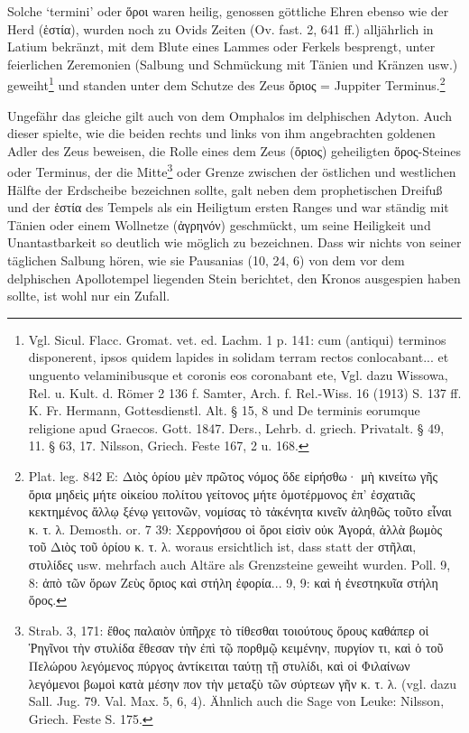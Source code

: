 \documentclass[a4paper, 11pt, oneside]{article}
\begin{document}
Solche `termini' oder ὅροι waren heilig, genossen göttliche Ehren ebenso wie der Herd (ἑστία), wurden noch zu Ovids Zeiten (Ov. fast. 2, 641 ff.) alljährlich in Latium bekränzt, mit dem Blute eines Lammes oder Ferkels besprengt, unter feierlichen Zeremonien (Salbung und Schmückung mit Tänien und Kränzen usw.) geweiht\footnote{Vgl. Sicul. Flacc. Gromat. vet. ed. Lachm. 1 p. 141: cum (antiqui) terminos disponerent, ipsos quidem lapides in solidam terram rectos conlocabant... et unguento velaminibusque et coronis eos coronabant ete, Vgl. dazu Wissowa, Rel. u. Kult. d. Römer 2 136 f. Samter, Arch. f. Rel.-Wiss. 16 (1913) S. 137 ff. K. Fr. Hermann, Gottesdienstl. Alt. § 15, 8 und De terminis eorumque religione apud Graecos. Gott. 1847. Ders., Lehrb. d. griech. Privatalt. § 49, 11. § 63, 17. Nilsson, Griech. Feste 167, 2 u. 168.} und standen unter dem Schutze des Zeus ὅριος = Juppiter Terminus.\footnote{Plat. leg. 842 E: Διὸς ὁρίου μὲν πρῶτος νόμος ὅδε εἰρήσθω· μὴ κινείτω γῆς ὅρια μηδεὶς μήτε οἰκείου πολίτου γείτονος μήτε ὁμοτέρμονος ἐπ' ἐσχατιᾶς κεκτημένος ἄλλῳ ξένῳ γειτονῶν, νομίσας τὸ τἀκένητα κινεῖν ἀληθῶς τοῦτο εἶναι κ. τ. λ. Demosth. or. 7 39: Χερρονήσου οἱ ὅροι εἰσὶν οὐκ Ἀγορά, ἀλλὰ βωμὸς τοῦ Διὸς τοῦ ὁρίου κ. τ. λ. woraus ersichtlich ist, dass statt der στῆλαι, στυλίδες usw. mehrfach auch Altäre als Grenzsteine geweiht wurden. Poll. 9, 8: ἀπὸ τῶν ὅρων Ζεὺς ὅριος καὶ στήλη ἐφορία... 9, 9: καὶ ἡ ἐνεστηκυῖα στήλη ὅρος.}

Ungefähr das gleiche gilt auch von dem Omphalos im delphischen Adyton. Auch dieser spielte, wie die beiden rechts und links von ihm angebrachten goldenen Adler des Zeus beweisen, die Rolle eines dem Zeus (ὅριος) geheiligten ὅρος-Steines oder Terminus, der die Mitte\footnote{Strab. 3, 171: ἔθος παλαιὸν ὑπῆρχε τὸ τίθεσθαι τοιούτους ὅρους καθάπερ οἱ Ῥηγῖνοι τὴν στυλίδα ἔθεσαν τὴν ἐπὶ τῷ πορθμῷ κειμένην, πυργίον τι, καὶ ὁ τοῦ Πελώρου λεγόμενος πύργος ἀντίκειται ταύτῃ τῇ στυλίδι, καὶ οἱ Φιλαίνων λεγόμενοι βωμοὶ κατὰ μέσην πον τὴν μεταξὺ τῶν σύρτεων γῆν κ. τ. λ. (vgl. dazu Sall. Jug. 79. Val. Max. 5, 6, 4). Ähnlich auch die Sage von Leuke: Nilsson, Griech. Feste S. 175.} oder Grenze zwischen der östlichen und westlichen Hälfte der Erdscheibe bezeichnen sollte, galt neben dem prophetischen Dreifuß und der ἑστία des Tempels als ein Heiligtum ersten Ranges und war ständig mit Tänien oder einem Wollnetze (ἀγρηνόν) geschmückt, um seine Heiligkeit und Unantastbarkeit so deutlich wie möglich zu bezeichnen. Dass wir nichts von seiner täglichen Salbung hören, wie sie Pausanias (10, 24, 6) von dem vor dem delphischen Apollotempel liegenden Stein berichtet, den Kronos ausgespien haben sollte, ist wohl nur ein Zufall.
\end{document}
